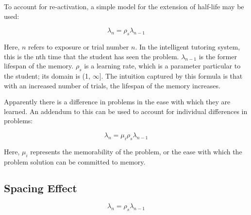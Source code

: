 To account for re-activation, a simple model for the extension of half-life
may be used: 

\begin{equation}
\label{eq:ebbinghaus}
 \lambda_n = \rho_s \lambda_{n-1}
\end{equation}

Here, $n$ refers to exposure or trial number $n$.  In the intelligent tutoring
system, this is the nth time that the student has seen the problem.
$\lambda_{n-1}$ is the former lifespan of the memory.  $\rho_s$ is a learning
rate, which is a parameter particular to the student; its domain is (1,
$\infty$].  The intuition captured by this formula is that with an increased
number of trials, the lifespan of the memory increases.

Apparently there is a difference in problems in the ease with which they are
learned.  An addendum to this can be used to account for individual differences
in problems: 

\begin{equation}
\label{eq:ebbinghaus}
 \lambda_n = \mu_i \rho_s \lambda_{n-1}
\end{equation}

Here, $\mu_i$ represents the memorability of the problem, or the ease with
which the problem solution can be committed to memory. 



\subsection{Spacing Effect}

\begin{equation}
\label{eq:ebbinghaus}
 \lambda_n = \rho_s \lambda_{n-1}
\end{equation}
